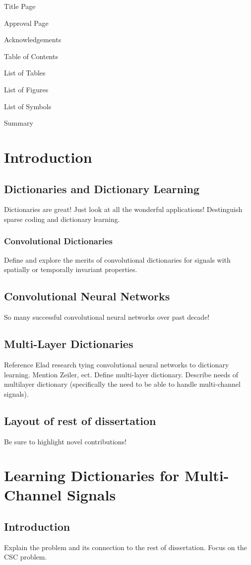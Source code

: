 \documentclass{article}
\begin{document}
Title Page

Approval Page

Acknowledgements

Table of Contents

List of Tables

List of Figures

List of Symbols

Summary

\section{Introduction}
\subsection{Dictionaries and Dictionary Learning}
Dictionaries are great! Just look at all the wonderful applications! Destinguish sparse coding and dictionary learning.
\subsubsection{Convolutional Dictionaries}
Define and explore the merits of convolutional dictionaries for signals with spatially or temporally invariant properties.
\subsection{Convolutional Neural Networks}
So many successful convolutional neural networks over past decade!
\subsection{Multi-Layer Dictionaries}
Reference Elad research tying convolutional neural networks to dictionary learning. Mention Zeiler, ect. Define multi-layer dictionary. Describe needs of multilayer dictionary (specifically the need to be able to handle multi-channel signals).
\subsection{Layout of rest of dissertation}
Be sure to highlight novel contributions!


\section{Learning Dictionaries for Multi-Channel Signals}
\subsection{Introduction}
Explain the problem and its connection to the rest of dissertation. Focus on the CSC problem.
\end{document}
